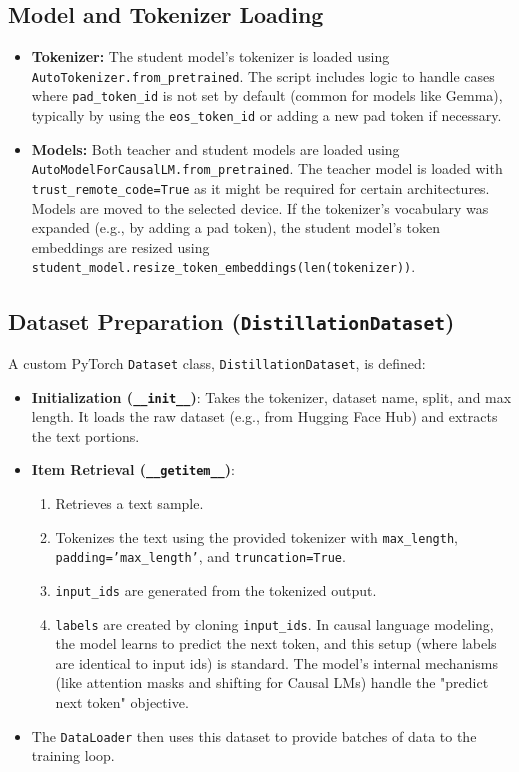 \documentclass[12pt, a4paper]{report}
\begin{document}
\subsection{Model and Tokenizer Loading}
\begin{itemize}
    \item \textbf{Tokenizer:} The student model's tokenizer is loaded using \texttt{AutoTokenizer.from\_pretrained}. The script includes logic to handle cases where \texttt{pad\_token\_id} is not set by default (common for models like Gemma), typically by using the \texttt{eos\_token\_id} or adding a new pad token if necessary.
    \item \textbf{Models:} Both teacher and student models are loaded using \texttt{AutoModelForCausalLM.from\_pretrained}. The teacher model is loaded with \texttt{trust\_remote\_code=True} as it might be required for certain architectures. Models are moved to the selected device. If the tokenizer's vocabulary was expanded (e.g., by adding a pad token), the student model's token embeddings are resized using \texttt{student\_model.resize\_token\_embeddings(len(tokenizer))}.
\end{itemize}

\subsection{Dataset Preparation (\texttt{DistillationDataset})}
A custom PyTorch \texttt{Dataset} class, \texttt{DistillationDataset}, is defined:
\begin{itemize}
    \item \textbf{Initialization (\texttt{\_\_init\_\_})}: Takes the tokenizer, dataset name, split, and max length. It loads the raw dataset (e.g., from Hugging Face Hub) and extracts the text portions.
    \item \textbf{Item Retrieval (\texttt{\_\_getitem\_\_})}:
        \begin{enumerate}
            \item Retrieves a text sample.
            \item Tokenizes the text using the provided tokenizer with \texttt{max\_length}, \texttt{padding='max\_length'}, and \texttt{truncation=True}.
            \item \texttt{input\_ids} are generated from the tokenized output.
            \item \texttt{labels} are created by cloning \texttt{input\_ids}. In causal language modeling, the model learns to predict the next token, and this setup (where labels are identical to input ids) is standard. The model's internal mechanisms (like attention masks and shifting for Causal LMs) handle the "predict next token" objective.
        \end{enumerate}
    \item The \texttt{DataLoader} then uses this dataset to provide batches of data to the training loop.
\end{itemize}
\end{document}
